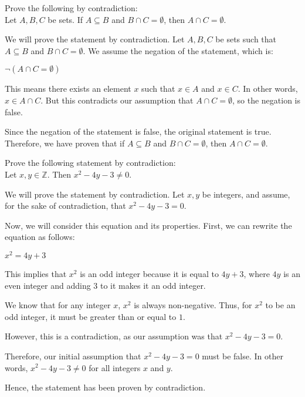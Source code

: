 \documentclass{article}
\newcommand{\Z}{\mathbb{Z}}
\theoremstyle{definition}
\begin{document}
\begin{question}
    Prove the following by contradiction:\\
    Let $A, B, C$ be sets. If $A\subseteq B$ and $B\cap C=\emptyset$, then $A\cap C=\emptyset$.
\end{question}
\begin{solution}
We will prove the statement by contradiction. Let $A, B, C$ be sets such that $A\subseteq B$ and $B\cap C = \emptyset$. We assume the negation of the statement, which is:

$\neg(A\cap C = \emptyset)$

This means there exists an element $x$ such that $x\in A$ and $x\in C$. In other words, $x\in A\cap C$. But this contradicts our assumption that $A\cap C = \emptyset$, so the negation is false.

Since the negation of the statement is false, the original statement is true. Therefore, we have proven that if $A\subseteq B$ and $B\cap C=\emptyset$, then $A\cap C=\emptyset$.
\end{solution}


\begin{question}
    Prove the following statement by contradiction:\\
    Let $x, y\in \Z$. Then $x^2-4y-3\neq 0$.
\end{question}
\begin{solution}
We will prove the statement by contradiction. Let $x, y$ be integers, and assume, for the sake of contradiction, that $x^2 - 4y - 3 = 0$. 

Now, we will consider this equation and its properties. First, we can rewrite the equation as follows:

$x^2 = 4y + 3$

This implies that $x^2$ is an odd integer because it is equal to $4y + 3$, where $4y$ is an even integer and adding $3$ to it makes it an odd integer. 

We know that for any integer $x$, $x^2$ is always non-negative. Thus, for $x^2$ to be an odd integer, it must be greater than or equal to $1$. 

However, this is a contradiction, as our assumption was that $x^2 - 4y - 3 = 0$. 

Therefore, our initial assumption that $x^2 - 4y - 3 = 0$ must be false. In other words, $x^2 - 4y - 3 \neq 0$ for all integers $x$ and $y$.

Hence, the statement has been proven by contradiction.
\end{solution}
\end{document}
